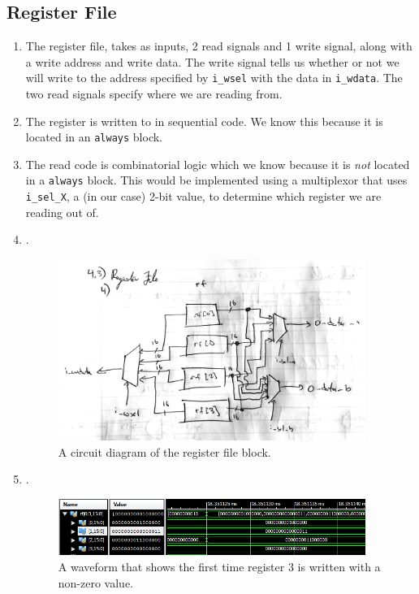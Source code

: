 \documentclass[]{article}
\begin{document}
\subsection{Register File}
\begin{enumerate}
\item The register file, takes as inputs, 2 read signals and 1 write signal, along with a write address and write data. The write signal tells us whether or not we will write to the address specified by \texttt{i\_wsel} with the data in \texttt{i\_wdata}. The two read signals specify where we are reading from.
\item The register is written to in sequential code. We know this because it is located in an \texttt{always} block.
\item The read code is combinatorial logic which we know because it is \textit{not} located in a \texttt{always} block. This would be implemented using a multiplexor that uses \texttt{i\_sel\_X}, a (in our case) 2-bit value, to determine which register we are reading out of.
\item  . %
\begin{figure}[h]
\centering
\includegraphics[width=10cm]{rf.jpg}
\caption{A circuit diagram of the register file block.}
\end{figure}
\item . %
\begin{figure}[H]
\centering
\includegraphics[width=10cm]{register.PNG}
\caption{A waveform that shows the first time register 3 is written with a non-zero value.}
\end{figure}
\end{enumerate}
\end{document}
